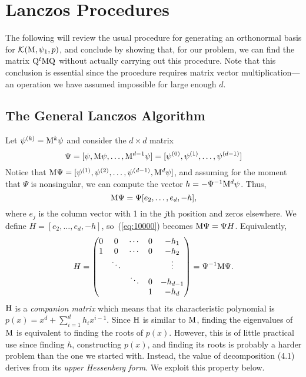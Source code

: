 \chapter{Lanczos Procedures}

The following will review the usual procedure for generating an orthonormal basis for
$\mathcal{K}(\mathrm{M}, \psi_1, p)$, 
and conclude by showing that, for our problem, we can find the matrix 
$\mathrm{Q}^t\mathrm{M}\mathrm{Q}$
without actually carrying out this procedure. Note that this conclusion is essential since the procedure
requires matrix vector multiplication---an operation we have assumed impossible for large enough $d$.

\section{The General Lanczos Algorithm}
\label{sec:gener-lancz-algor}
Let $\psi^{(k)} =  \mathrm{M}^k \psi$ and consider the $d\times d$ matrix
\[
\Psi = [\psi, \mathrm{M}\psi, \dots, \mathrm{M}^{d-1}\psi] = [\psi^{(0)}, \psi^{(1)}, \dots, \psi^{(d-1)}]
\]
Notice that $\mathrm{M}\Psi = [\psi^{(1)}, \psi^{(2)}, \dots, \psi^{(d-1)}, \mathrm{M}^d \psi]$,
and assuming for the moment that $\Psi$ is nonsingular,
we can compute the vector $h = -\Psi^{-1}\mathrm{M}^d \psi$. Thus,
\begin{equation}
\label{eq:10000}
\mathrm{M}\Psi = \Psi [e_2,\dots,e_d,-h],  
\end{equation}
where $e_j$ is the column vector with 1 in
the $j$th position and zeros elsewhere. We define $H = [e_2,\dots,e_d,-h]$,
so~(\ref{eq:10000}) becomes $\mathrm{M}\Psi = \Psi H$.
%
%
%
%
Equivalently,
\begin{equation}
  \label{eq:4.1}
H = 
\begin{pmatrix}
0 & 0      & \cdots & 0 & -h_1 \\
1 & 0      & \cdots & 0 & -h_2\\
  & \ddots &        &   & \vdots \\
  &        & \ddots & 0 & -h_{d-1}\\
  &        &        & 1 & -h_{d}
\end{pmatrix} = \Psi^{-1} \mathrm{M} \Psi.
\end{equation}
$\mathrm{H}$ is a \emph{companion matrix} which means that its characteristic polynomial
is $p(x) = x^d + \sum_{i=1}^d h_i x^{i-1}$.
Since $\mathrm{H}$ is similar to $\mathrm{M}$, finding the eigenvalues of $\mathrm{M}$ is equivalent to
finding the roots of $p(x)$. However, this is of little practical use since
finding $h$, constructing $p(x)$, and finding its roots is 
probably a harder problem than the one we started with. Instead, the value of decomposition (4.1)
derives from its \emph{upper Hessenberg form}. We exploit this property below.

